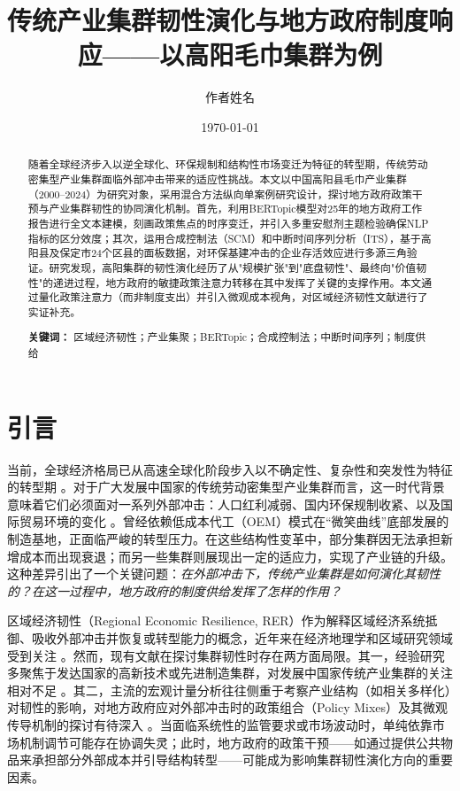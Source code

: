 \documentclass[12pt,a4paper]{ctexart}
\title{传统产业集群韧性演化与地方政府制度响应——以高阳毛巾集群为例}
\author[1]{作者姓名}
\affil[1]{作者单位}
\date{\today}
\begin{document}
\maketitle

\begin{abstract}
随着全球经济步入以逆全球化、环保规制和结构性市场变迁为特征的转型期，传统劳动密集型产业集群面临外部冲击带来的适应性挑战。本文以中国高阳县毛巾产业集群（2000--2024）为研究对象，采用混合方法纵向单案例研究设计，探讨地方政府政策干预与产业集群韧性的协同演化机制。首先，利用BERTopic模型对25年的地方政府工作报告进行全文本建模，刻画政策焦点的时序变迁，并引入多重安慰剂主题检验确保NLP指标的区分效度；其次，运用合成控制法（SCM）和中断时间序列分析（ITS），基于高阳县及保定市24个区县的面板数据，对环保基建冲击的企业存活效应进行多源三角验证。研究发现，高阳集群的韧性演化经历了从"规模扩张"到"底盘韧性"、最终向"价值韧性"的递进过程，地方政府的敏捷政策注意力转移在其中发挥了关键的支撑作用。本文通过量化政策注意力（而非制度支出）并引入微观成本视角，对区域经济韧性文献进行了实证补充。

\vspace{0.5cm}
\noindent\textbf{关键词：} 区域经济韧性；产业集聚；BERTopic；合成控制法；中断时间序列；制度供给
\end{abstract}

\newpage
\section{引言}
\label{sec:intro}

当前，全球经济格局已从高速全球化阶段步入以不确定性、复杂性和突发性为特征的转型期 \cite{Tooze2022}。对于广大发展中国家的传统劳动密集型产业集群而言，这一时代背景意味着它们必须面对一系列外部冲击：人口红利减弱、国内环保规制收紧、以及国际贸易环境的变化 \cite{Gong2022}。曾经依赖低成本代工（OEM）模式在“微笑曲线”底部发展的制造基地，正面临严峻的转型压力。在这些结构性变革中，部分集群因无法承担新增成本而出现衰退；而另一些集群则展现出一定的适应力，实现了产业链的升级。这种差异引出了一个关键问题：\textit{在外部冲击下，传统产业集群是如何演化其韧性的？在这一过程中，地方政府的制度供给发挥了怎样的作用？}

区域经济韧性（Regional Economic Resilience, RER）作为解释区域经济系统抵御、吸收外部冲击并恢复或转型能力的概念，近年来在经济地理学和区域研究领域受到关注 \cite{Martin2012, Boschma2015}。然而，现有文献在探讨集群韧性时存在两方面局限。其一，经验研究多聚焦于发达国家的高新技术或先进制造集群，对发展中国家传统产业集群的关注相对不足 \cite{Li2022}。其二，主流的宏观计量分析往往侧重于考察产业结构（如相关多样化）对韧性的影响，对地方政府应对外部冲击时的政策组合（Policy Mixes）及其微观传导机制的探讨有待深入 \cite{Rothgang2024, Bachtler2024}。当面临系统性的监管要求或市场波动时，单纯依靠市场机制调节可能存在协调失灵；此时，地方政府的政策干预——如通过提供公共物品来承担部分外部成本并引导结构转型——可能成为影响集群韧性演化方向的重要因素。
\end{document}
